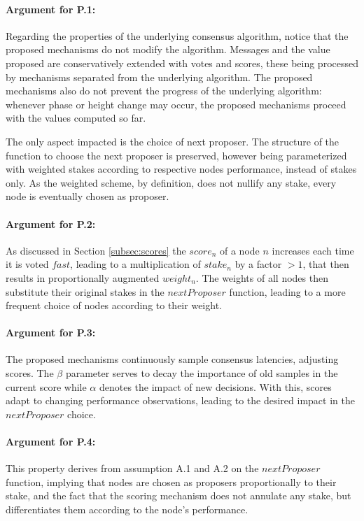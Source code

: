 \paragraph{Argument for P.1:} 
Regarding the properties of the underlying consensus algorithm, notice that the proposed mechanisms do not modify the algorithm.   Messages and the value proposed are conservatively extended with votes and scores,  these being processed by mechanisms separated from the underlying algorithm.  The proposed mechanisms also do not prevent the progress of the underlying algorithm: whenever 
phase or height change may occur, the proposed mechanisms proceed with the values computed so far.  

The only aspect impacted is the choice of next proposer.
The structure of the function to choose the next proposer is preserved, however being parameterized with weighted stakes according to respective nodes performance, instead of stakes only. As the weighted scheme, by definition, does not nullify any stake, every node is eventually chosen as proposer. 

\paragraph{Argument for P.2:} 
As discussed in Section \ref{subsec:scores} the $score_n$ of a node $n$ increases each time it is voted $fast$, leading to a multiplication of $stake_n$ by a factor $> 1$, that then results in proportionally augmented $weight_n$.   The weights of all nodes then substitute their original stakes in the $nextProposer$ function, leading to a more frequent choice of nodes according to their weight. 

\paragraph{Argument for P.3:} 
The proposed mechanisms continuously sample consensus latencies, adjusting scores.
The $\beta$ parameter serves to decay the importance of old samples in the current score while $\alpha$ denotes the impact of new decisions.  With this, scores adapt to changing performance observations, leading to the desired impact in the $nextProposer$ choice.

\paragraph{Argument for P.4:} 
This property derives from assumption A.1 and A.2 on the $nextProposer$ function, implying that nodes are chosen as proposers proportionally to their stake, and the fact that the scoring mechanism does not annulate any stake, but differentiates them according to the node's performance.  

